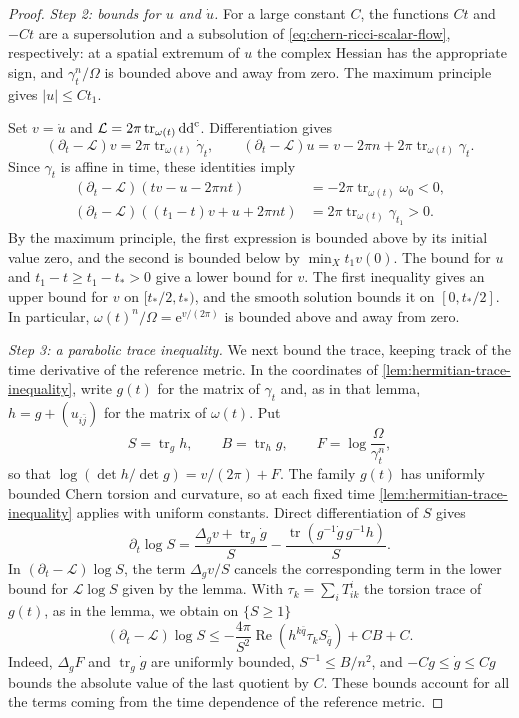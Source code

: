 \begin{proof}
\emph{Step 2: bounds for $u$ and $\dot u$.} For a large constant $C$, the functions $Ct$ and $-Ct$ are a supersolution and a subsolution of \eqref{eq:chern-ricci-scalar-flow}, respectively: at a spatial extremum of $u$ the complex Hessian has the appropriate sign, and $\gamma_t^n/\Omega$ is bounded above and away from zero. The maximum principle gives $|u|\leq Ct_1$.

Set $v=\dot u$ and $\mathcal L=2\pi\operatorname{tr}_{\omega(t)}\mathrm{dd}^{\mathrm{c}}$. Differentiation gives
\[
 (\partial_t-\mathcal L)v=2\pi\operatorname{tr}_{\omega(t)}\dot\gamma_t,
 \qquad
 (\partial_t-\mathcal L)u=v-2\pi n+2\pi\operatorname{tr}_{\omega(t)}\gamma_t.
\]
Since $\gamma_t$ is affine in time, these identities imply
\begin{align*}
 (\partial_t-\mathcal L)(t v-u-2\pi nt)
     &=-2\pi\operatorname{tr}_{\omega(t)}\omega_0<0,\\
 (\partial_t-\mathcal L)((t_1-t)v+u+2\pi nt)
     &=2\pi\operatorname{tr}_{\omega(t)}\gamma_{t_1}>0.
\end{align*}
By the maximum principle, the first expression is bounded above by its initial value zero, and the second is bounded below by $\min_Xt_1v(0)$. The bound for $u$ and $t_1-t\geq t_1-t_*>0$ give a lower bound for $v$. The first inequality gives an upper bound for $v$ on $[t_*/2,t_*)$, and the smooth solution bounds it on $[0,t_*/2]$. In particular, $\omega(t)^n/\Omega=\mathrm{e}^{v/(2\pi)}$ is bounded above and away from zero.

\emph{Step 3: a parabolic trace inequality.} We next bound the trace, keeping track of the time derivative of the reference metric. In the coordinates of \cref{lem:hermitian-trace-inequality}, write $g(t)$ for the matrix of $\gamma_t$ and, as in that lemma, $h=g+(u_{i\bar j})$ for the matrix of $\omega(t)$. Put
\[
 S=\operatorname{tr}_g h,\qquad B=\operatorname{tr}_h g,
 \qquad F=\log\frac{\Omega}{\gamma_t^n},
\]
so that $\log(\det h/\det g)=v/(2\pi)+F$. The family $g(t)$ has uniformly bounded Chern torsion and curvature, so at each fixed time \cref{lem:hermitian-trace-inequality} applies with uniform constants. Direct differentiation of $S$ gives
\[
 \partial_t\log S
   =\frac{\Delta_g v+\operatorname{tr}_g\dot g}{S}
       -\frac{\operatorname{tr}(g^{-1}\dot g\,g^{-1}h)}{S}.
\]
In $(\partial_t-\mathcal L)\log S$, the term $\Delta_gv/S$ cancels the corresponding term in the lower bound for $\mathcal L\log S$ given by the lemma. With $\tau_k=\sum_iT_{ik}^i$ the torsion trace of $g(t)$, as in the lemma, we obtain on $\{S\geq1\}$
\begin{equation}\label{eq:chern-ricci-parabolic-trace}
 (\partial_t-\mathcal L)\log S
 \leq-\frac{4\pi}{S^2}\operatorname{Re}(h^{k\bar q}\tau_k S_{\bar q})+CB+C.
\end{equation}
Indeed, $\Delta_gF$ and $\operatorname{tr}_g\dot g$ are uniformly bounded, $S^{-1}\leq B/n^2$, and $-Cg\leq\dot g\leq Cg$ bounds the absolute value of the last quotient by $C$. These bounds account for all the terms coming from the time dependence of the reference metric.


\end{proof}
